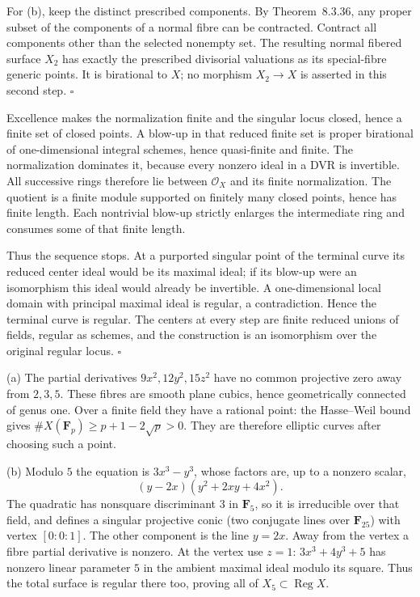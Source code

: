 \documentclass[11pt]{article}
\let\chapterexercise\exercise
\renewcommand{\exercise}[2]{\Needspace{8\baselineskip}\chapterexercise{#1}{#2}}
\begin{document}
For (b), keep the distinct prescribed components. By Theorem~8.3.36, any proper subset of the components of a normal fibre can be contracted. Contract all components other than the selected nonempty set. The resulting normal fibered surface $X_2$ has exactly the prescribed divisorial valuations as its special-fibre generic points. It is birational to $X$; no morphism $X_2\to X$ is asserted in this second step. \hfill$\square$

\pf
Excellence makes the normalization finite and the singular locus closed, hence a finite set of closed points. A blow-up in that reduced finite set is proper birational of one-dimensional integral schemes, hence quasi-finite and finite. The normalization dominates it, because every nonzero ideal in a DVR is invertible. All successive rings therefore lie between $\mathcal O_X$ and its finite normalization. The quotient is a finite module supported on finitely many closed points, hence has finite length. Each nontrivial blow-up strictly enlarges the intermediate ring and consumes some of that finite length.

Thus the sequence stops. At a purported singular point of the terminal curve its reduced center ideal would be its maximal ideal; if its blow-up were an isomorphism this ideal would already be invertible. A one-dimensional local domain with principal maximal ideal is regular, a contradiction. Hence the terminal curve is regular. The centers at every step are finite reduced unions of fields, regular as schemes, and the construction is an isomorphism over the original regular locus. \hfill$\square$

\pf
(a) The partial derivatives $9x^2,12y^2,15z^2$ have no common projective zero away from $2,3,5$. These fibres are smooth plane cubics, hence geometrically connected of genus one. Over a finite field they have a rational point: the Hasse--Weil bound gives $\#X(\mathbf F_p)\ge p+1-2\sqrt p>0$. They are therefore elliptic curves after choosing such a point.

(b) Modulo $5$ the equation is $3x^3-y^3$, whose factors are, up to a nonzero scalar,
\[ (y-2x)(y^2+2xy+4x^2). \]
The quadratic has nonsquare discriminant $3$ in $\mathbf F_5$, so it is irreducible over that field, and defines a singular projective conic (two conjugate lines over $\mathbf F_{25}$) with vertex $[0:0:1]$. The other component is the line $y=2x$. Away from the vertex a fibre partial derivative is nonzero. At the vertex use $z=1$: $3x^3+4y^3+5$ has nonzero linear parameter $5$ in the ambient maximal ideal modulo its square. Thus the total surface is regular there too, proving all of $X_5\subset\operatorname{Reg}X$.
\end{document}
